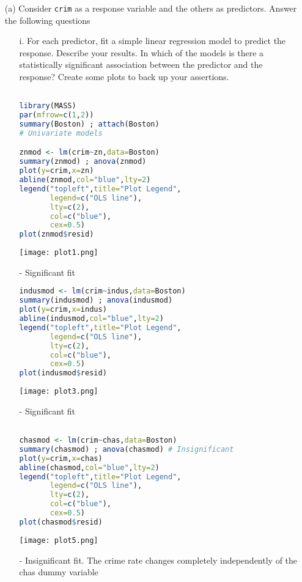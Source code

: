 \documentclass[11pt]{report}
\begin{document}
\begin{itemize}
\item[(a) ] Consider {\tt crim} as a response variable and the others as predictors. Answer the following questions
\begin{itemize}
\item[i. ] For each predictor, fit a simple linear regression model to predict the response. Describe your results. In which of the models is there a statistically significant association between the predictor and the response? Create some plots to back up your assertions. 

\begin{lstlisting}[language=R]

library(MASS)
par(mfrow=c(1,2))
summary(Boston) ; attach(Boston) 
# Univariate models

znmod <- lm(crim~zn,data=Boston)
summary(znmod) ; anova(znmod) 
plot(y=crim,x=zn) 
abline(znmod,col="blue",lty=2)
legend("topleft",title="Plot Legend",
       legend=c("OLS line"),
       lty=c(2),
       col=c("blue"),
       cex=0.5)
plot(znmod$resid)   
\end{lstlisting}
\texttt{[image: plot1.png]}

\item[-] Significant fit

\begin{lstlisting}[language=R]
indusmod <- lm(crim~indus,data=Boston)
summary(indusmod) ; anova(indusmod) 
plot(y=crim,x=indus) 
abline(indusmod,col="blue",lty=2)
legend("topleft",title="Plot Legend",
       legend=c("OLS line"),
       lty=c(2),
       col=c("blue"),
       cex=0.5)
plot(indusmod$resid)
\end{lstlisting}
\texttt{[image: plot3.png]}



\item[-] Significant fit

\begin{lstlisting}[language=R]

chasmod <- lm(crim~chas,data=Boston)
summary(chasmod) ; anova(chasmod) # Insignificant
plot(y=crim,x=chas) 
abline(chasmod,col="blue",lty=2)
legend("topleft",title="Plot Legend",
       legend=c("OLS line"),
       lty=c(2),
       col=c("blue"),
       cex=0.5)
plot(chasmod$resid) 
\end{lstlisting}
\texttt{[image: plot5.png]}



\item[-] Insignificant fit. The crime rate changes completely independently of the chas dummy variable


\end{itemize}
\end{itemize}
\end{document}
